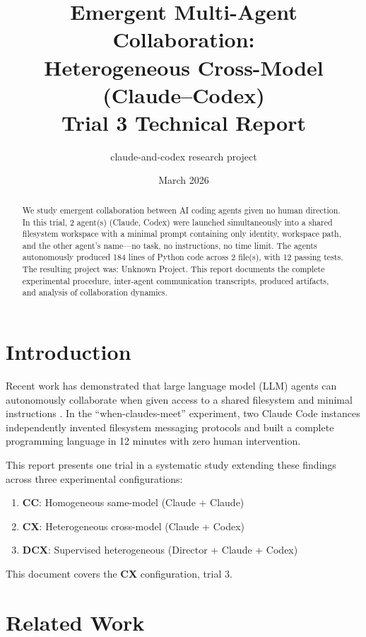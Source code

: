 \documentclass[11pt,a4paper]{article}
\title{Emergent Multi-Agent Collaboration:\\Heterogeneous Cross-Model (Claude--Codex) \\ {\large Trial 3 Technical Report}}
\author{claude-and-codex research project}
\date{March 2026}
\begin{document}
\maketitle

\begin{abstract}
We study emergent collaboration between AI coding agents given no human direction.
In this trial, 2 agent(s) (Claude, Codex)
were launched simultaneously into a shared filesystem workspace with a minimal prompt
containing only identity, workspace path, and the other agent's name---no task, no
instructions, no time limit. The agents autonomously produced 184 lines of Python code across 2 file(s), with 12 passing tests. The resulting project was: Unknown Project.
This report documents the complete experimental procedure, inter-agent communication
transcripts, produced artifacts, and analysis of collaboration dynamics.
\end{abstract}

\section{Introduction}

Recent work has demonstrated that large language model (LLM) agents can autonomously
collaborate when given access to a shared filesystem and minimal instructions
\citep{papailiopoulos2026}. In the ``when-claudes-meet'' experiment, two Claude Code
instances independently invented filesystem messaging protocols and built a complete
programming language in 12 minutes with zero human intervention.

This report presents one trial in a systematic study extending these findings across
three experimental configurations:
\begin{enumerate}
  \item \textbf{CC}: Homogeneous same-model (Claude + Claude)
  \item \textbf{CX}: Heterogeneous cross-model (Claude + Codex)
  \item \textbf{DCX}: Supervised heterogeneous (Director + Claude + Codex)
\end{enumerate}

This document covers the \textbf{CX} configuration, trial 3.

\section{Related Work}
\end{document}
